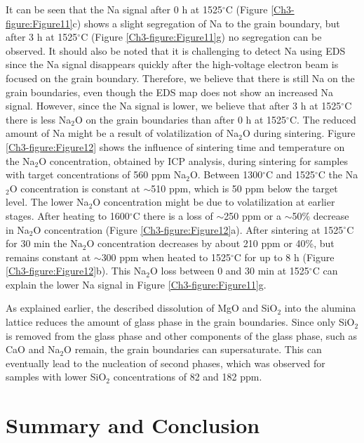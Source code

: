 It can be seen that the Na signal after 0 h at 1525$^{\circ}$C (Figure \ref{Ch3-figure:Figure11}c) shows a slight segregation of Na to the grain boundary, but after 3 h at 1525$^{\circ}$C (Figure \ref{Ch3-figure:Figure11}g) no segregation can be observed. It should also be noted that it is challenging to detect Na using EDS since the Na signal disappears quickly after the high-voltage electron beam is focused on the grain boundary. Therefore, we believe that there is still Na on the grain boundaries, even though the EDS map does not show an increased Na signal. However, since the Na signal is lower, we believe that after 3 h at 1525$^{\circ}$C there is less Na$_{2}$O on the grain boundaries than after 0 h at 1525$^{\circ}$C. The reduced amount of Na might be a result of volatilization of Na$_{2}$O during sintering. Figure \ref{Ch3-figure:Figure12} shows the influence of sintering time and temperature on the Na$_{2}$O concentration, obtained by ICP analysis, during sintering for samples with target concentrations of 560 ppm Na$_{2}$O. Between 1300$^{\circ}$C and 1525$^{\circ}$C the Na$_{2}$O concentration is constant at $\sim$510 ppm, which is 50 ppm below the target level. The lower Na$_{2}$O concentration might be due to volatilization at earlier stages. After heating to 1600$^{\circ}$C there is a loss of $\sim$250 ppm or a $\sim$50\% decrease in Na$_{2}$O concentration (Figure \ref{Ch3-figure:Figure12}a). After sintering at 1525$^{\circ}$C for 30 min the Na$_{2}$O concentration decreases by about 210 ppm or 40\%, but remains constant at $\sim$300 ppm when heated to 1525$^{\circ}$C for up to 8 h (Figure \ref{Ch3-figure:Figure12}b). This Na$_{2}$O loss between 0 and 30 min at 1525$^{\circ}$C can explain the lower Na signal in Figure \ref{Ch3-figure:Figure11}g. 

As explained earlier, the described dissolution of MgO and SiO$_{2}$ into the alumina lattice reduces the amount of glass phase in the grain boundaries. Since only SiO$_{2}$ is removed from the glass phase and other components of the glass phase, such as CaO and Na$_{2}$O remain, the grain boundaries can supersaturate. This can eventually lead to the nucleation of second phases, which was observed for samples with lower SiO$_{2}$ concentrations of 82 and 182 ppm.

\section{Summary and Conclusion}

